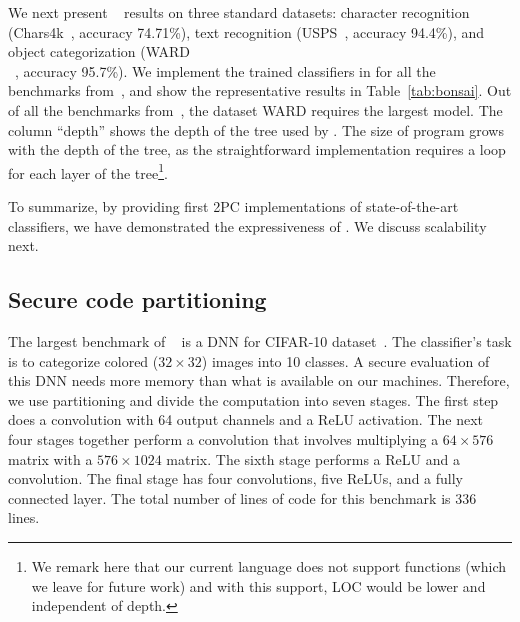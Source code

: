 We next present \bonsai~\cite{bonsai} results on three
standard datasets: character recognition (Chars4k~\cite{campos},
accuracy 74.71\%), text recognition (USPS~\cite{hull}, accuracy
94.4\%), and object categorization (WARD\\~\cite{yang}, accuracy
95.7\%). 
We implement the trained classifiers in \tool for all the benchmarks
from~\cite{bonsai},
and show the representative results in Table~\ref{tab:bonsai}.
Out of all the benchmarks from~\cite{bonsai}, the dataset WARD
requires the largest model. 
The column ``depth''  shows the depth of the
tree used by \bonsai. The size of \tool 
program grows with the depth of the tree, as the straightforward \tool
implementation requires a loop for each layer of the
tree\footnote{We remark here that our current language does not support functions (which we leave for future work) and with this support, LOC would be lower and independent of depth.}. 

To summarize, by providing first 2PC implementations of
state-of-the-art classifiers, we have demonstrated the expressiveness
of \tool. We discuss scalability next.


\subsection{Secure code partitioning}
\label{sec:pipeeval}
The largest benchmark of \minion~\cite{minionn} is a DNN for CIFAR-10
dataset~\cite{cifar}. 
The classifier's task is to categorize colored ($32\times 32$) images
into 10 classes. A secure evaluation of this DNN needs more memory
than what is available
on our machines. Therefore, we use partitioning and divide the
computation into seven stages. 
The first step does a convolution with 64 output channels and a ReLU
activation. The next four stages together perform a convolution that
involves multiplying a $64\times 576$ matrix with a 
$576\times 1024$ matrix. The sixth stage performs a ReLU and a
convolution. The final stage has four convolutions, five ReLUs, and a
fully connected layer. The total number of lines of \tool code for
this benchmark is 336 lines.

